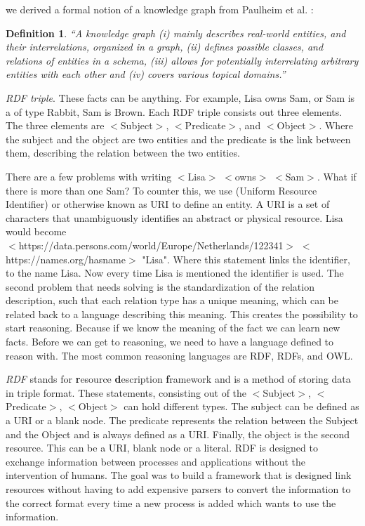 \documentclass[11pt,letterpaper ,oneside ]{book}
\newtheorem{definition}{Definition}
\begin{document}
	we derived a formal notion of a knowledge graph from Paulheim et al. \cite{HeikoP:2016}:
	\begin{definition} 
		“A knowledge graph (i) mainly describes real-world entities, and their interrelations, organized in a graph, (ii) defines possible classes, and relations of entities in a schema, (iii) allows for potentially interrelating arbitrary entities with each other and (iv) covers various topical domains.”
	\end{definition}
	
	\textit{RDF triple}. These facts can be anything. For example, Lisa owns Sam, or Sam is a of type Rabbit, Sam is Brown. Each RDF triple consists out three elements.
	The three elements are $<$Subject$>$, $<$Predicate$>$, and $<$Object$>$. Where the subject and the object are two entities and the predicate is the link between them, describing the relation between the two entities. 
	
	There are a few problems with writing $<$Lisa$>$ $<$owns$>$ $<$Sam$>$. What if there is more than one Sam? To counter this, we use (Uniform Resource Identifier) or otherwise known as URI to define an entity. A URI is a set of characters that unambiguously identifies an abstract or physical resource. Lisa would become \\$<$https://data.persons.com/world/Europe/Netherlands/122341$>$ $<$https://names.org/hasname$>$ "Lisa". Where this statement links the identifier, to the name Lisa. Now every time Lisa is mentioned the identifier is used. 
	The second problem that needs solving is the standardization of the relation description, such that each relation type has a unique meaning, which can be related back to a language describing this meaning. This creates the possibility to start reasoning. Because if we know the meaning of the fact we can learn new facts. Before we can get to reasoning, we need to have a language defined to reason with. The most common reasoning languages are RDF, RDFs, and OWL.
	
	\textit{RDF} \cite{rdfPrimer:2014} stands for \textbf{r}esource \textbf{d}escription \textbf{f}ramework and is a method of storing data in triple format. These statements, consisting out of the $<$Subject$>$, $<$Predicate$>$, $<$Object$>$ can hold different types. The subject can be defined as a URI or a blank node. The predicate represents the relation between the Subject and the Object and is always defined as a URI. Finally, the object is the second resource. This can be a URI, blank node or a literal.
	RDF is designed to exchange information between processes and applications without the intervention of humans. The goal was to build a framework that is designed link resources without having to add expensive parsers to convert the information to the correct format every time a new process is added which wants to use the information.\\
	
\end{document}
